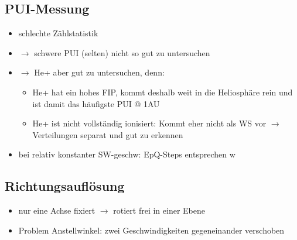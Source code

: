 \documentclass[]{article}
\begin{document}
\subsection{PUI-Messung}
	\begin{itemize}
		\item schlechte Zählstatistik
		\item $\rightarrow$ 	schwere PUI (selten) nicht so gut zu untersuchen
		\item $\rightarrow$ He+ aber gut zu untersuchen, denn:
		\begin{itemize}
			\item He+ hat ein hohes FIP, kommt deshalb weit in die Heliosphäre rein und ist damit das häufigste PUI @ 1AU
			\item He+ ist nicht vollständig ionisiert: Kommt eher nicht als WS vor $\rightarrow$ Verteilungen separat und gut zu erkennen
		\end{itemize}
		\item bei relativ konstanter SW-geschw: EpQ-Steps entsprechen w
	\end{itemize}
\subsection{Richtungsauflösung}
	\begin{itemize}
		\item nur eine Achse fixiert $\rightarrow$  rotiert frei in einer Ebene
		\item Problem Anstellwinkel: zwei Geschwindigkeiten gegeneinander verschoben
	\end{itemize}
%
%
%
\newpage
\end{document}
